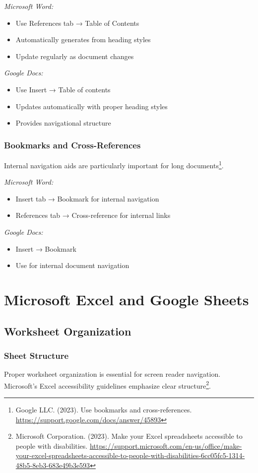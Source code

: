 \emph{Microsoft Word:}
\begin{itemize}
\item Use References tab → Table of Contents
\item Automatically generates from heading styles
\item Update regularly as document changes
\end{itemize}

\emph{Google Docs:}
\begin{itemize}
\item Use Insert → Table of contents
\item Updates automatically with proper heading styles
\item Provides navigational structure
\end{itemize}

\subsubsection{Bookmarks and Cross-References}
Internal navigation aids are particularly important for long documents\footnote{Google LLC. (2023). Use bookmarks and cross-references. \url{https://support.google.com/docs/answer/45893}}.

\emph{Microsoft Word:}
\begin{itemize}
\item Insert tab → Bookmark for internal navigation
\item References tab → Cross-reference for internal links
\end{itemize}

\emph{Google Docs:}
\begin{itemize}
\item Insert → Bookmark
\item Use for internal document navigation
\end{itemize}

\section{Microsoft Excel and Google Sheets}
\label{sec:excel-google-sheets}

\subsection{Worksheet Organization}

\subsubsection{Sheet Structure}
Proper worksheet organization is essential for screen reader navigation. Microsoft's Excel accessibility guidelines emphasize clear structure\footnote{Microsoft Corporation. (2023). Make your Excel spreadsheets accessible to people with disabilities. \url{https://support.microsoft.com/en-us/office/make-your-excel-spreadsheets-accessible-to-people-with-disabilities-6cc05fc5-1314-48b5-8eb3-683e49b3e593}}.

